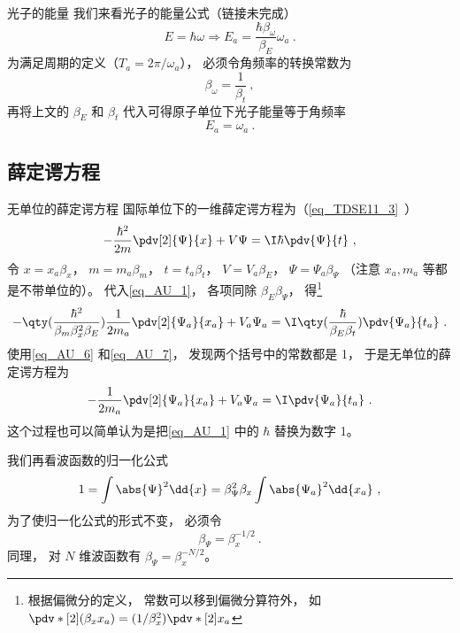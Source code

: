 \begin{example}{光子的能量}
我们来看光子的能量公式（链接未完成）
\begin{equation}
E = \hbar \omega \Longrightarrow E_a = \frac{\hbar\beta_\omega}{\beta_E}\omega_a~.
\end{equation}
为满足周期的定义（$T_a = 2\pi/\omega_a$）， 必须令角频率的转换常数为
\begin{equation}
\beta_\omega = \frac{1}{\beta_t}~,
\end{equation}
再将上文的 $\beta_E$ 和 $\beta_t$ 代入可得原子单位下光子能量等于角频率
\begin{equation}\label{eq_AU_2}
E_a = \omega_a~.
\end{equation}
\end{example}

\subsection{薛定谔方程}
\begin{example}{无单位的薛定谔方程}\label{ex_AU_1}
国际单位下的一维薛定谔方程为（\autoref{eq_TDSE11_3}~）
\begin{equation}\label{eq_AU_1}
-\frac{\hbar^2}{2m} \pdv[2]{\Psi}{x} + V\Psi= \I\hbar \pdv{\Psi}{t}~,
\end{equation}
令 $x = x_a\beta_x$， $m = m_a\beta_m$， $t = t_a\beta_t$， $V = V_a\beta_E$， $\Psi = \Psi_a \beta_\Psi$ （注意 $x_a, m_a$ 等都是不带单位的）。
代入\autoref{eq_AU_1}， 各项同除 $\beta_E\beta_\Psi$， 得\footnote{根据偏微分的定义， 常数可以移到偏微分算符外， 如 $\pdv*[2]{(\beta_x x_a)} = (1/\beta_x^2) \pdv*[2]{x_a}$}
\begin{equation}\label{eq_AU_3}
-\qty(\frac{\hbar^2}{\beta_m\beta_x^2\beta_E})\frac{1}{2m_a} \pdv[2]{\Psi_a}{x_a} + V_a\Psi_a= \I\qty(\frac{\hbar}{\beta_E\beta_t})\pdv{\Psi_a}{t_a}~.
\end{equation}
使用\autoref{eq_AU_6} 和\autoref{eq_AU_7}， 发现两个括号中的常数都是 1， 于是无单位的薛定谔方程为
\begin{equation}\label{eq_AU_4}
-\frac{1}{2m_a} \pdv[2]{\Psi_a}{x_a} + V_a\Psi_a= \I\pdv{\Psi_a}{t_a}~.
\end{equation}
这个过程也可以简单认为是把\autoref{eq_AU_1} 中的 $\hbar$ 替换为数字 1。

我们再看波函数的归一化公式
\begin{equation}
1 = \int \abs{\Psi}^2 \dd{x} = \beta_\Psi^2 \beta_x \int \abs{\Psi_a}^2 \dd{x_a}~,
\end{equation}
为了使归一化公式的形式不变， 必须令
\begin{equation}\label{eq_AU_5}
\beta_\Psi = \beta_x^{-1/2}~.
\end{equation}
同理， 对 $N$ 维波函数有 $\beta_\Psi = \beta_x^{-N/2}$。
\end{example}

